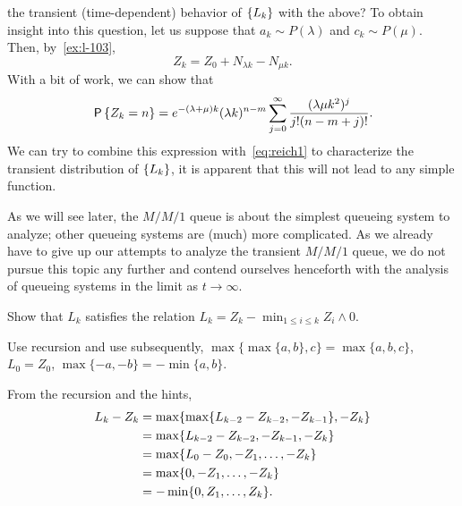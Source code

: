  the transient (time-dependent) behavior of $\{\L_k\}$ with the above?
To obtain insight into this question, let us suppose that $a_k\sim P(\lambda)$ and $c_k \sim P(\mu)$.
Then, by~\cref{ex:l-103},
\begin{equation*}
 Z_k = Z_0+N_{\lambda k} - N_{\mu k}.
\end{equation*}
With a bit of work, we can show that
\begin{equation*}
 \P{Z_k=n}
= e^{-(\lambda+\mu)k} (\lambda k)^{n-m} \sum_{j=0}^\infty 
\frac{(\lambda\mu k^2)^j} {j!(n-m+j)!}.
\end{equation*}
We can try to combine this expression with~\cref{eq:reich1} to characterize the transient distribution of $\{\L_k\}$, it is apparent that this will  not lead to any simple function.

As we will see later, the $M/M/1$ queue is about the simplest queueing system to analyze; other queueing systems are (much) more complicated. As we already have to give up our attempts to analyze the transient $M/M/1$ queue, we do not pursue this topic any further and contend ourselves henceforth with the analysis of queueing systems in the limit as $t\to\infty$.


\begin{exercise}\label{ex:l-133}
Show that $L_k$ satisfies the relation $L_k = Z_k - \min_{1\leq i \leq k} Z_i\wedge 0$.
\begin{hint}
  Use recursion and use subsequently,
$\max\{\max\{a,b\}, c\} = \max\{a,b,c\}$, $L_0 = Z_0$, $\max\{-a, -b \} = -\min\{a,b\}$.
\end{hint}
\begin{solution}
From the recursion and the hints, 
\begin{equation*}
 \begin{split}
 L_k - Z_{k} 
&= \max\{\max\{\L_{k-2} - Z_{k-2}, -Z_{k-1}\}, -Z_k\} \\
&= \max\{\L_{k-2} - Z_{k-2}, -Z_{k-1}, -Z_k\} \\
&= \max\{\L_{0} - Z_{0}, -Z_1, \ldots, -Z_k\} \\
&= \max\{0, -Z_1, \ldots, -Z_k\} \\
&= - \min\{0, Z_1, \ldots, Z_k\}.
 \end{split}
 \end{equation*}
\end{solution}
\end{exercise}


